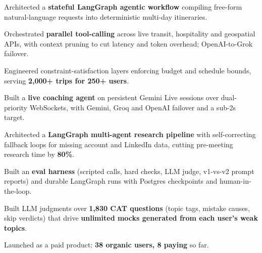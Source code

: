 \documentclass[10pt]{article}
\begin{document}
\begin{rkbody}
\begin{rkitems}
  \item Architected a \textbf{stateful LangGraph agentic workflow} compiling free-form natural-language requests into deterministic multi-day itineraries.
  \item Orchestrated \textbf{parallel tool-calling} across live transit, hospitality and geospatial APIs, with context pruning to cut latency and token overhead; OpenAI-to-Grok failover.
  \item Engineered constraint-satisfaction layers enforcing budget and schedule bounds, serving \textbf{2,000+ trips for 250+ users}.
\end{rkitems}
\begin{rkitems}
  \item Built a \textbf{live coaching agent} on persistent Gemini Live sessions over dual-priority WebSockets, with Gemini, Groq and OpenAI failover and a sub-2s target.
  \item Architected a \textbf{LangGraph multi-agent research pipeline} with self-correcting fallback loops for missing account and LinkedIn data, cutting pre-meeting research time by \textbf{80\%}.
  \item Built an \textbf{eval harness} (scripted calls, hard checks, LLM judge, v1-vs-v2 prompt reports) and durable LangGraph runs with Postgres checkpoints and human-in-the-loop.
\end{rkitems}
\begin{rkitems}
  \item Built LLM judgments over \textbf{1,830 CAT questions} (topic tags, mistake causes, skip verdicts) that drive \textbf{unlimited mocks generated from each user's weak topics}.
  \item Launched as a paid product: \textbf{38 organic users, 8 paying} so far.
\end{rkitems}


\end{rkbody}
\end{document}
